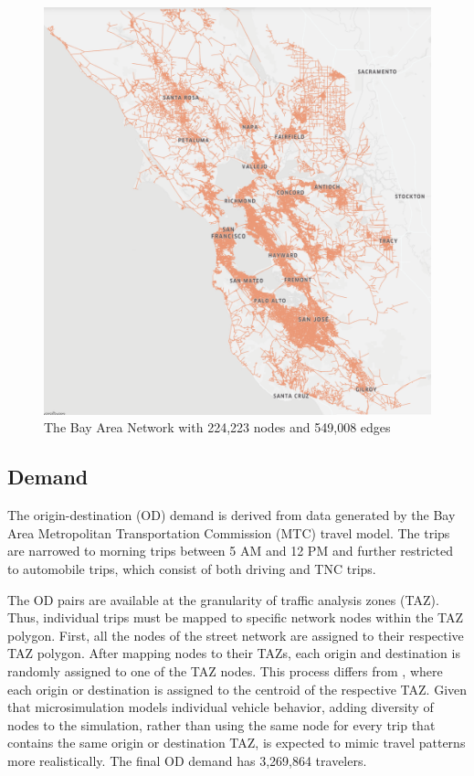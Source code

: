 \documentclass[final]{IEEEtran}
\begin{document}

\begin{figure}
    \centering
    \includegraphics[width=.45\textwidth]{figs/bay_area_edges_kepler.png}
    \caption{The Bay Area Network with 224,223 nodes and 549,008 edges}
    \label{fig:bay_area_edges}
\end{figure}

\subsection{Demand}

The origin-destination (OD) demand is derived from data generated by the Bay Area Metropolitan Transportation Commission (MTC) travel model. The trips are narrowed to morning trips between 5 AM and 12 PM and further restricted to automobile trips, which consist of both driving and TNC trips.

The OD pairs are available at the granularity of traffic analysis zones (TAZ). Thus, individual trips must be mapped to specific network nodes within the TAZ polygon. First, all the nodes of the street network are assigned to their respective TAZ polygon. After mapping nodes to their TAZs, each origin and destination is randomly assigned to one of the TAZ nodes. This process differs from \cite{waddellIntegratedPipelineArchitecture2018}, where each origin or destination is assigned to the centroid of the respective TAZ. Given that microsimulation models individual vehicle behavior, adding diversity of nodes to the simulation, rather than using the same node for every trip that contains the same origin or destination TAZ, is expected to mimic travel patterns more realistically. The final OD demand has 3,269,864 travelers.
\end{document}

